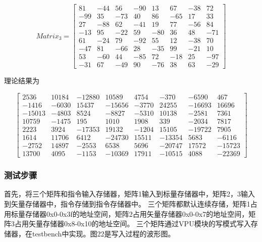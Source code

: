 \documentclass[UTF8]{ctexart}
\begin{document}
\begin{equation}
Matrix_3
=
\left[
\begin{array}{cccccccc}
    81 & -44 & 56 & -90 &  13 & 67 & -38 &  72\\
   -99 &  35 &-73 &  40 &  86 &-65 &  17 &  33\\
    27 & -88 & 62 & -41 &  19 & 77 & -56 &  84\\
   -13 &  95 &-22 &  59 & -80 & 36 &  48 & -71\\
    61 & -24 & 79 & -92 &  55 & 12 & -38 &  70\\
   -47 &  81 &-66 &  28 & -35 & 99 & -21 &  10\\
    53 & -60 & 44 & -85 &  72 &-18 &  25 & -97\\
   -31 &  67 &-49 &  90 & -76 & 38 &  63 & -29
\end{array}
\right]
\end{equation}

理论结果为

\begin{equation}
\left[
\begin{array}{cccccccc}
    2536  &  10184 & -12880 &  10589 &  4754  & -370   & -6590  &  467   \\
   -1416  & -6030  &  15437 & -15656 & -3770  &  24255 & -16693 &  16696 \\
   -15013 & -4803  &  8524  & -8827  & -5310  &  10138 & -2581  &  7361  \\
    10759 & -1475  &  195   &  1010  &  1908  &  339   & -2034  &  7817  \\
    2223  &  3924  & -17353 &  19132 & -1204  &  15105 & -19722 &  7905  \\
    1614  &  11706 &  6412  & -24730 &  15511 & -13354 &  5683  & -6116  \\
   -2752  &  14897 & -2553  &  6538  &  5696  & -20747 &  17572 & -15723 \\
    13700 &  4095  & -1153  & -10369 &  17911 & -10515 &  4088  & -22369
\end{array}
\right]
\end{equation}

\subsubsection{测试步骤}
首先，将三个矩阵和指令输入存储器，矩阵1输入到标量存储器中，矩阵2，3输入到矢量存储器中，指令存储到指令存储器中。
三个矩阵都默认连续存储，矩阵1占用标量存储器0x0-0x3f的地址空间，矩阵2占用矢量存储器0x0-0x7的地址空间，矩阵3占用矢量存储器0x8-0x10的地址空间。
三个矩阵通过VPU模块的写模式写入存储器，在testbench中实现。图22是写入过程的波形图。
\end{document}
